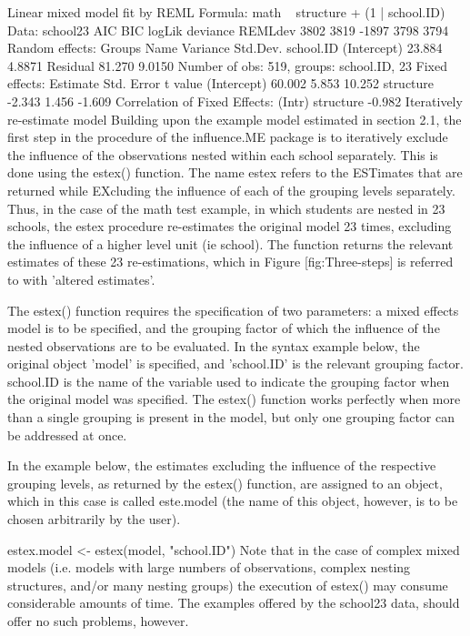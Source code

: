 Linear mixed model fit by REML 
Formula: math ~ structure + (1 | school.ID) 
   Data: school23 
  AIC  BIC logLik deviance REMLdev
 3802 3819  -1897     3798    3794
Random effects:
 Groups    Name        Variance Std.Dev.
 school.ID (Intercept) 23.884   4.8871  
 Residual              81.270   9.0150  
Number of obs: 519, groups: school.ID, 23
Fixed effects:
            Estimate Std. Error t value
(Intercept)   60.002      5.853  10.252
structure     -2.343      1.456  -1.609
Correlation of Fixed Effects:
          (Intr)
structure -0.982
Iteratively re-estimate model
Building upon the example model estimated in section 2.1, the first step in the procedure of the influence.ME package is to iteratively exclude the influence of the observations nested within each school separately. This is done using the estex() function. The name estex refers to the ESTimates that are returned while EXcluding the influence of each of the grouping levels separately. Thus, in the case of the math test example, in which students are nested in 23 schools, the estex procedure re-estimates the original model 23 times, excluding the influence of a higher level unit (ie school). The function returns the relevant estimates of these 23 re-estimations, which in Figure [fig:Three-steps] is referred to with 'altered estimates'.

The estex() function requires the specification of two parameters: a mixed effects model is to be specified, and the grouping factor of which the influence of the nested observations are to be evaluated. In the syntax example below, the original object 'model' is specified, and 'school.ID' is the relevant grouping factor. school.ID is the name of the variable used to indicate the grouping factor when the original model was specified. The estex() function works perfectly when more than a single grouping is present in the model, but only one grouping factor can be addressed at once.

In the example below, the estimates excluding the influence of the respective grouping levels, as returned by the estex() function, are assigned to an object, which in this case is called este.model (the name of this object, however, is to be chosen arbitrarily by the user).

estex.model <- estex(model, "school.ID")
Note that in the case of complex mixed models (i.e. models with large numbers of observations, complex nesting structures, and/or many nesting groups) the execution of estex() may consume considerable amounts of time. The examples offered by the school23 data, should offer no such problems, however.

